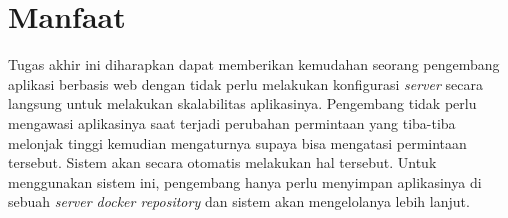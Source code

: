 	\section{Manfaat}
		Tugas akhir ini diharapkan dapat memberikan kemudahan seorang pengembang aplikasi berbasis web dengan tidak perlu melakukan konfigurasi \textit{server} secara langsung untuk melakukan skalabilitas aplikasinya. Pengembang tidak perlu mengawasi aplikasinya saat terjadi perubahan permintaan yang tiba-tiba melonjak tinggi kemudian mengaturnya supaya bisa mengatasi permintaan tersebut. Sistem akan secara otomatis melakukan hal tersebut. Untuk menggunakan sistem ini, pengembang hanya perlu menyimpan aplikasinya di sebuah \textit{server docker repository} dan sistem akan mengelolanya lebih lanjut.

